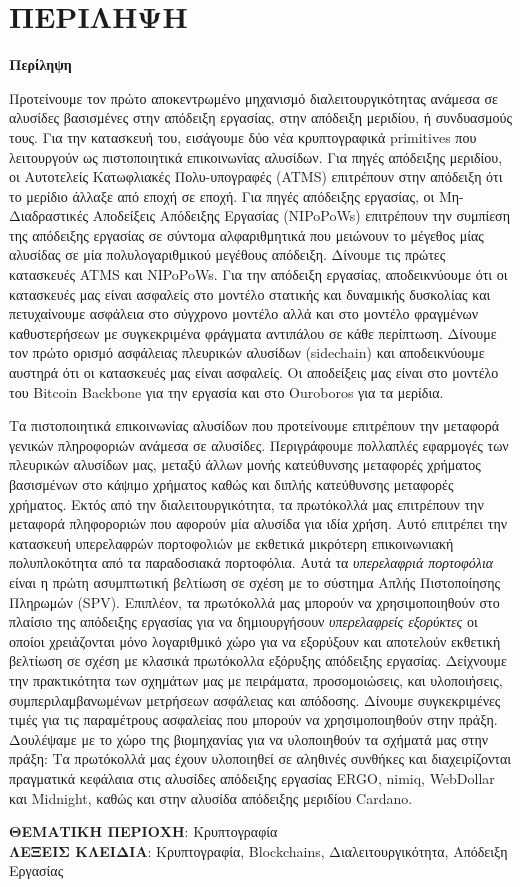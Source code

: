 \ifuniversity
\chapter*{ΠΕΡΙΛΗΨΗ}
\thispagestyle{empty}
\else
\begin{center}%
  {\bfseries Περίληψη}%
\end{center}%
\fi

Προτείνουμε τον πρώτο αποκεντρωμένο μηχανισμό διαλειτουργικότητας ανάμεσα σε
αλυσίδες βασισμένες στην απόδειξη εργασίας, στην απόδειξη μεριδίου, ή
συνδυασμούς τους. Για την κατασκευή του, εισάγουμε δύο νέα κρυπτογραφικά
primitives που λειτουργούν ως πιστοποιητικά επικοινωνίας αλυσίδων. Για πηγές
απόδειξης μεριδίου, οι Αυτοτελείς Κατωφλιακές
Πολυ-υπογραφές (ATMS) επιτρέπουν στην απόδειξη ότι το μερίδιο άλλαξε από εποχή
σε εποχή. Για πηγές απόδειξης εργασίας, οι Μη-Διαδραστικές Αποδείξεις Απόδειξης
Εργασίας (NIPoPoWs)
επιτρέπουν την συμπίεση της απόδειξης εργασίας σε σύντομα αλφαριθμητικά που
μειώνουν το μέγεθος μίας αλυσίδας σε μία πολυλογαριθμικού μεγέθους απόδειξη.
Δίνουμε τις πρώτες κατασκευές ATMS και NIPoPoWs. Για την απόδειξη εργασίας,
αποδεικνύουμε ότι οι κατασκευές μας είναι ασφαλείς στο μοντέλο στατικής και
δυναμικής δυσκολίας και πετυχαίνουμε ασφάλεια στο σύγχρονο μοντέλο αλλά και
στο μοντέλο φραγμένων καθυστερήσεων με συγκεκριμένα φράγματα αντιπάλου σε κάθε
περίπτωση. Δίνουμε τον πρώτο ορισμό ασφάλειας πλευρικών αλυσίδων (sidechain) και
αποδεικνύουμε αυστηρά ότι οι κατασκευές μας είναι ασφαλείς. Οι αποδείξεις μας
είναι στο μοντέλο του Bitcoin Backbone για την εργασία και στο Ouroboros για τα
μερίδια.

Τα πιστοποιητικά επικοινωνίας αλυσίδων που προτείνουμε επιτρέπουν την μεταφορά
γενικών πληροφοριών ανάμεσα σε αλυσίδες. Περιγράφουμε πολλαπλές εφαρμογές των
πλευρικών αλυσίδων μας, μεταξύ άλλων μονής κατεύθυνσης μεταφορές χρήματος βασισμένων
στο κάψιμο χρήματος καθώς και διπλής κατεύθυνσης μεταφορές χρήματος.
Εκτός από την διαλειτουργικότητα, τα πρωτόκολλά μας επιτρέπουν την μεταφορά
πληφοροριών που αφορούν μία αλυσίδα για ιδία χρήση.
Αυτό επιτρέπει την κατασκευή υπερελαφρών πορτοφολιών με εκθετικά μικρότερη
επικοινωνιακή πολυπλοκότητα από τα παραδοσιακά πορτοφόλια.
Αυτά τα \emph{υπερελαφριά πορτοφόλια} είναι η πρώτη ασυμπτωτική βελτίωση σε σχέση με
το σύστημα Απλής Πιστοποίησης Πληρωμών (SPV).
Επιπλέον, τα πρωτόκολλά μας μπορούν να χρησιμοποιηθούν στο πλαίσιο της απόδειξης
εργασίας για να δημιουργήσουν \emph{υπερελαφρείς εξορύκτες} οι οποίοι
χρειάζονται μόνο λογαριθμικό χώρο για να εξορύξουν και αποτελούν εκθετική
βελτίωση σε σχέση με κλασικά πρωτόκολλα εξόρυξης απόδειξης εργασίας.
Δείχνουμε την πρακτικότητα των σχημάτων μας με πειράματα, προσομοιώσεις, και
υλοποιήσεις, συμπεριλαμβανωμένων μετρήσεων ασφάλειας και απόδοσης.
Δίνουμε συγκεκριμένες τιμές για τις παραμέτρους ασφαλείας που μπορούν να
χρησιμοποιηθούν στην πράξη. Δουλέψαμε με το χώρο της βιομηχανίας για να
υλοποιηθούν τα σχήματά μας στην πράξη: Τα πρωτόκολλά μας έχουν υλοποιηθεί σε
αληθινές συνθήκες και διαχειρίζονται πραγματικά κεφάλαια στις αλυσίδες απόδειξης
εργασίας ERGO, nimiq, WebDollar και Midnight, καθώς και στην αλυσίδα απόδειξης
μεριδίου Cardano.\\

\ifuniversity
\vfill

{\bfseries ΘΕΜΑΤΙΚΗ ΠΕΡΙΟΧΗ}: Κρυπτογραφία\\

{\bfseries ΛΕΞΕΙΣ ΚΛΕΙΔΙΑ}: Κρυπτογραφία, Blockchains, Διαλειτουργικότητα, Απόδειξη Εργασίας
\clearpage
\fi

